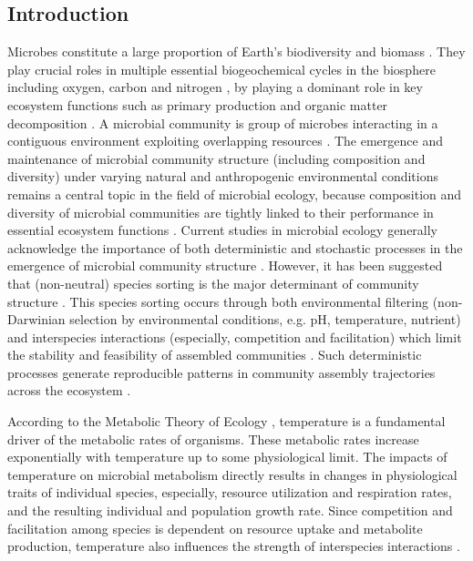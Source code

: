 \documentclass[11pt, a4paper]{article}
\begin{document}
\begin{spacing}{1.5}
\clearpage

\tableofcontents 
\clearpage

\linenumbers
\renewcommand\thesection{\arabic{section}}
\section{Introduction}

Microbes constitute a large proportion of Earth's biodiversity \citep{locey2016scaling} and biomass \citep{bar2018biomass, whitman1998prokaryotes}. They play crucial roles in multiple essential biogeochemical cycles in the biosphere including oxygen, carbon and nitrogen \citep{gupta2017microbes}, by playing a dominant role in key ecosystem functions such as primary production and organic matter decomposition \citep{delgado2016microbial}. A microbial community is group of microbes interacting in a contiguous environment exploiting overlapping resources \citep{konopka2009microbial}. The emergence and maintenance of microbial community structure (including composition and diversity) under varying natural and anthropogenic environmental conditions remains a central topic in the field of microbial ecology, because composition and diversity of microbial communities are tightly linked to their performance in essential ecosystem functions \citep{morris2020linking}. Current studies in microbial ecology generally acknowledge the importance of both deterministic and stochastic processes in the emergence of microbial community structure \citep{vellend2010conceptual, chase2011disentangling, tilman2004niche, cadotte2007concurrent}. However, it has been suggested that (non-neutral) species sorting is the major determinant of community structure \citep{van2007power, stegen2012stochastic, logue2010species}. This species sorting occurs through both environmental filtering (non-Darwinian selection by environmental conditions, e.g. pH, temperature, nutrient) \citep{glassman2017environmental} and interspecies interactions (especially, competition and facilitation) which limit the stability and feasibility of assembled communities \citep{pawar2009community, pascual2020metabolically}. Such deterministic processes generate reproducible patterns in community assembly trajectories across the ecosystem \citep{goldford2018emergent, pascual2020community, borrelli2015selection}. 

According to the Metabolic Theory of Ecology \citep{brown2004toward}, temperature is a fundamental driver of the metabolic rates of organisms. These metabolic rates increase exponentially with temperature up to some physiological limit. The impacts of temperature on microbial metabolism directly results in changes in physiological traits \citep{violle2007let} of individual species, especially, resource utilization and respiration rates, and the resulting individual and population growth rate. Since competition and facilitation among species is dependent on resource uptake and metabolite production, temperature also influences the strength of interspecies interactions \citep{tilman1981competition, bestion2018metabolic, burman2021microbial, lin2016temperature}. 


\end{spacing}
\end{document}
